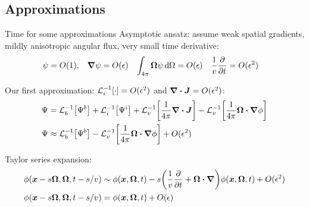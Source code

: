 \documentclass{beamer}
\begin{document}
\subsection{Approximations}
\begin{frame}{Time for some approximations}
  Asymptotic ansatz: assume weak spatial gradients, mildly anisotropic angular flux, very small time
  derivative:
\begin{align*}
  \psi &= O(1), &
  \bm{\nabla} \psi &= O(\epsilon)&
  \int_{4\pi} \bm{\Omega} \psi\mathop{}\!\mathrm{d}\Omega &= O(\epsilon)&
  \frac{1}{v} \frac{\partial }{\partial t} &= O(\epsilon^2)
\end{align*}

Our first approximation: $\mathcal{L}_{i}^{-1}\!\left[\cdot\right] = O(\epsilon^2)$ and $\bm{\nabla} \bm{\cdot} \bm{J} =
O(\epsilon^2)$:
\begin{align*}
  \Psi &= \mathcal{L}_{b}^{-1}\!\left[\Psi^b\right] + \mathcal{L}_{i}^{-1}\!\left[\Psi^i\right]
  + \mathcal{L}_{v}^{-1}\!\left[\frac{1}{4\pi} \bm{\nabla} \bm{\cdot}\bm{J}\right] -
  \mathcal{L}_{v}^{-1}\!\left[\frac{1}{4\pi} \bm{\Omega}\bm{\cdot} \bm{\nabla} \phi\right]
    \\ 
  \Psi 
  &\approx \mathcal{L}_{b}^{-1}\!\left[\Psi^b\right] - \mathcal{L}_{v}^{-1}\!\left[\frac{1}{4\pi} \bm{\Omega}\bm{\cdot} \bm{\nabla} \phi\right]
  + O(\epsilon^2)
\end{align*}

Taylor series expansion:
\begin{align} \nonumber
  \phi(\bm{x} - s\bm{\Omega}, \bm{\Omega}, t - s/v)
  &\sim \phi(\bm{x}, \bm{\Omega}, t)
  - s \bigg( \frac{1}{v} \frac{\partial }{\partial t} + \bm{\Omega} \bm{\cdot} \bm{\nabla} \bigg)
  \phi(\bm{x}, \bm{\Omega}, t) + O(\epsilon^2)
\\ \label{eq:taylorPhi}
\phi(\bm{x} - s\bm{\Omega}, \bm{\Omega}, t - s/v)
&= \phi(\bm{x}, \bm{\Omega}, t) + O(\epsilon)
\end{align}
\end{frame}
\end{document}
